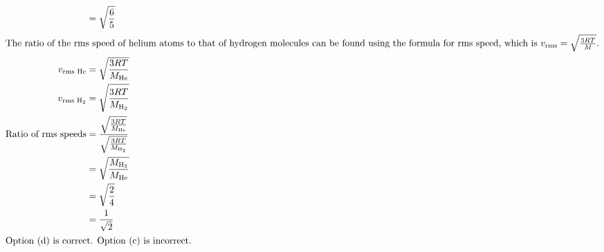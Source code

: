 \begin{solution}
\begin{align*}
            &= \sqrt{\frac{6}{5}}\\
            \intertext{The ratio of the rms speed of helium atoms to that of hydrogen molecules can be found using the formula for rms speed, which is \( v_{\text{rms}} = \sqrt{\frac{3RT}{M}} \).}
            v_{\text{rms He}} &= \sqrt{\frac{3RT}{M_{\text{He}}}}\\
            v_{\text{rms H}_2} &= \sqrt{\frac{3RT}{M_{\text{H}_2}}}\\
            \text{Ratio of rms speeds} &= \frac{\sqrt{\frac{3RT}{M_{\text{He}}}}}{\sqrt{\frac{3RT}{M_{\text{H}_2}}}}\\
            &= \sqrt{\frac{M_{\text{H}_2}}{M_{\text{He}}}}\\
            &= \sqrt{\frac{2}{4}}\\
            &= \frac{1}{\sqrt{2}}\\
            \intertext{Option (d) is correct. Option (c) is incorrect.}
        \end{align*}
    \end{solution}